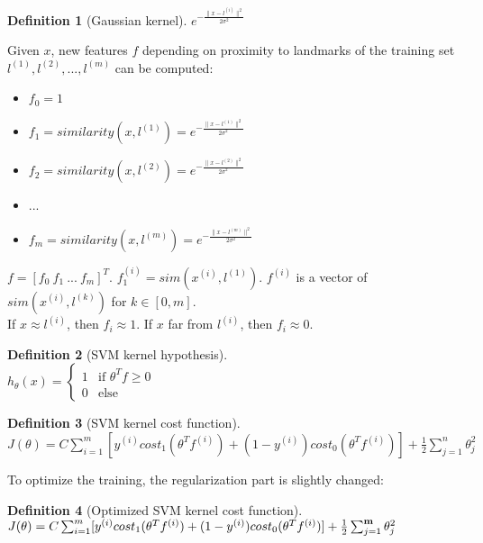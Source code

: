 \documentclass{report}
\newtheorem{definition}{Definition}[section]
\begin{document}
\begin{definition}[Gaussian kernel]
$e^{-\frac{\lVert x - l^{(i)} \rVert^2}{2\sigma^2}}$
\end{definition}

Given $x$, new features $f$ depending on proximity to landmarks of the training set $l^{(1)}, l^{(2)}, ..., l^{(m)}$ can be computed:
\begin{itemize}
\item $f_0 = 1$
\item $f_1 = similarity(x,l^{(1)})=e^{-\frac{\lVert x - l^{(1)} \rVert^2}{2\sigma^2}}$
\item $f_2 = similarity(x,l^{(2)})=e^{-\frac{\lVert x - l^{(2)} \rVert^2}{2\sigma^2}}$
\item ...
\item $f_m = similarity(x,l^{(m)})=e^{-\frac{\lVert x - l^{(m)} \rVert^2}{2\sigma^2}}$
\end{itemize}

$f = [f_0\:f_1\:...\:f_m]^T$. $f_1^{(i)}=sim(x^{(i)},l^{(1)})$. $f^{(i)}$ is a vector of $sim(x^{(i)},l^{(k)})$ for $k \in [0,m]$. \\
If $x\approx l^{(i)}$, then $f_i\approx 1$. If $x$ far from $l^{(i)}$, then $f_i\approx 0$.

\begin{definition}[SVM kernel hypothesis]~\\
$h_{\theta}(x) =
\left\{
\begin{array}{lll}
1  & \mbox{if } \theta^Tf \ge 0 \\
0  & \mbox{else}
\end{array}
\right.$ \\
\end{definition}

\begin{definition}[SVM kernel cost function]~\\
$J(\theta)=C\sum_{i=1}^m[y^{(i)}cost_1(\theta^Tf^{(i)})+(1-y^{(i)})cost_0(\theta^Tf^{(i)})]+\frac{1}{2}\sum_{j=1}^n\theta_j^2$
\end{definition}

To optimize the training, the regularization part is slightly changed:
\begin{definition}[Optimized SVM kernel cost function]~\\
$J(\theta)=C\sum_{i=1}^m[y^{(i)}cost_1(\theta^Tf^{(i)})+(1-y^{(i)})cost_0(\theta^Tf^{(i)})]+\frac{1}{2}\sum_{j=1}^{\bf m}\theta_j^2$
\end{definition}
\end{document}
